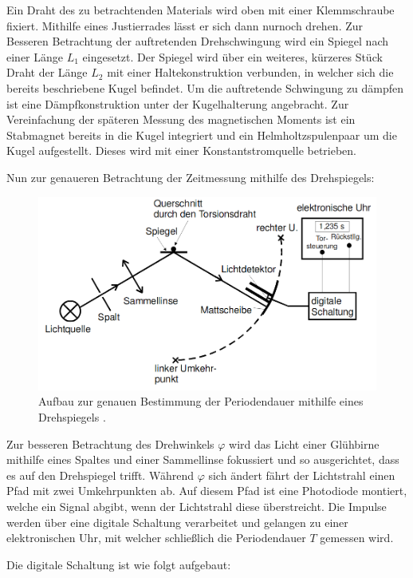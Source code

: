         Ein Draht des zu betrachtenden Materials wird oben mit einer Klemmschraube fixiert. Mithilfe eines
           Justierrades lässt er sich dann nurnoch drehen. Zur Besseren
            Betrachtung der auftretenden Drehschwingung wird ein Spiegel nach einer Länge $L_1$ eingesetzt. Der
             Spiegel wird über ein weiteres, kürzeres Stück Draht der Länge $L_2$ mit
             einer Haltekonstruktion verbunden, in welcher sich die bereits
              beschriebene Kugel befindet.
               Um die auftretende Schwingung zu dämpfen ist eine Dämpfkonstruktion
                unter der Kugelhalterung angebracht. Zur Vereinfachung der späteren Messung des magnetischen Moments ist ein Stabmagnet
               bereits in die Kugel integriert und ein Helmholtzspulenpaar um die Kugel aufgestellt. Dieses wird
                 mit einer Konstantstromquelle betrieben.

                 Nun zur genaueren Betrachtung der Zeitmessung mithilfe des Drehspiegels:

                 \begin{figure}[H]
                          \centering
                          \includegraphics[width=\linewidth-150pt,height=\textheight-150pt,keepaspectratio]{content/Bilder/Drehspiegel.png}
                          \caption{Aufbau zur genauen Bestimmung der Periodendauer mithilfe eines Drehspiegels \cite{V102}.}
                          \label{fig:Drehspiegel}
                        \end{figure}

Zur besseren Betrachtung des Drehwinkels $\varphi$ wird das Licht einer Glühbirne
 mithilfe eines Spaltes und einer Sammellinse fokussiert und so ausgerichtet,
  dass es auf den Drehspiegel trifft. Während $\varphi$ sich ändert fährt der
   Lichtstrahl einen Pfad mit zwei Umkehrpunkten ab. Auf diesem Pfad ist eine
    Photodiode montiert, welche ein Signal abgibt, wenn der Lichtstrahl
     diese überstreicht. Die Impulse werden über eine digitale Schaltung verarbeitet und
      gelangen zu einer elektronischen Uhr, mit welcher schließlich die Periodendauer $T$ gemessen wird.

      Die digitale Schaltung ist wie folgt aufgebaut:
